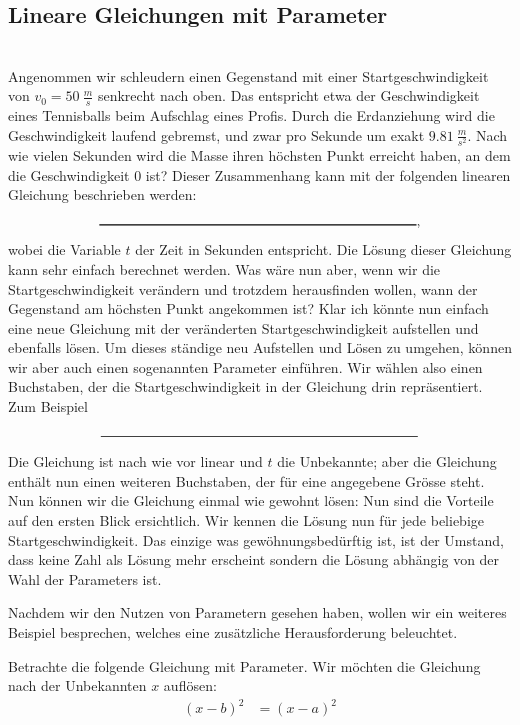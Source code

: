 \documentclass[11pt,oneside]{article}
\begin{document}
\subsection{Lineare Gleichungen mit Parameter}
	\begin{beispiel} \ \\
		Angenommen wir schleudern einen Gegenstand mit einer Startgeschwindigkeit von $v_0=50\:\frac{m}{s}$ senkrecht nach oben. Das entspricht etwa der Geschwindigkeit eines Tennisballs beim Aufschlag eines Profis. Durch die Erdanziehung wird die Geschwindigkeit laufend gebremst, und zwar pro Sekunde um exakt $9.81\:\frac{m}{s^2}$. Nach wie vielen Sekunden wird die Masse ihren höchsten Punkt erreicht haben, an dem die Geschwindigkeit $0$ ist?\vspace*{17pt}\newline
		Dieser Zusammenhang kann mit der folgenden linearen Gleichung beschrieben werden: \[\gap{8},\] wobei die Variable $t$ der Zeit in Sekunden entspricht. Die Lösung dieser Gleichung kann sehr einfach berechnet werden.\vspace{5pt}\newline{}
		Was wäre nun aber, wenn wir die Startgeschwindigkeit verändern und trotzdem herausfinden wollen, wann der Gegenstand am höchsten Punkt angekommen ist? Klar ich könnte nun einfach eine neue Gleichung mit der veränderten Startgeschwindigkeit aufstellen und ebenfalls lösen. Um dieses ständige neu Aufstellen und Lösen zu umgehen, können wir aber auch einen sogenannten Parameter einführen. Wir wählen also einen Buchstaben, der die Startgeschwindigkeit in der Gleichung drin repräsentiert. Zum Beispiel \[\gap{8}\] Die Gleichung ist nach wie vor linear und $t$ die Unbekannte; aber die Gleichung enthält nun einen weiteren Buchstaben, der für eine angegebene Grösse steht. Nun können wir die Gleichung einmal wie gewohnt lösen: \vspace*{5pt}\newline{}
		Nun sind die Vorteile auf den ersten Blick ersichtlich. Wir kennen die Lösung nun für jede beliebige Startgeschwindigkeit. Das einzige was gewöhnungsbedürftig ist, ist der Umstand, dass keine Zahl als Lösung mehr erscheint sondern die Lösung abhängig von der Wahl der Parameters ist.
	\end{beispiel}
	Nachdem wir den Nutzen von Parametern gesehen haben, wollen wir ein weiteres Beispiel besprechen, welches eine zusätzliche Herausforderung beleuchtet.
	\begin{beispiel}
		Betrachte die folgende Gleichung mit Parameter. Wir möchten die Gleichung nach der Unbekannten $x$ auflösen:
		\begin{align*}
			(x-b)^2 &= (x-a)^2
		\end{align*}
	\end{beispiel}
\end{document}
